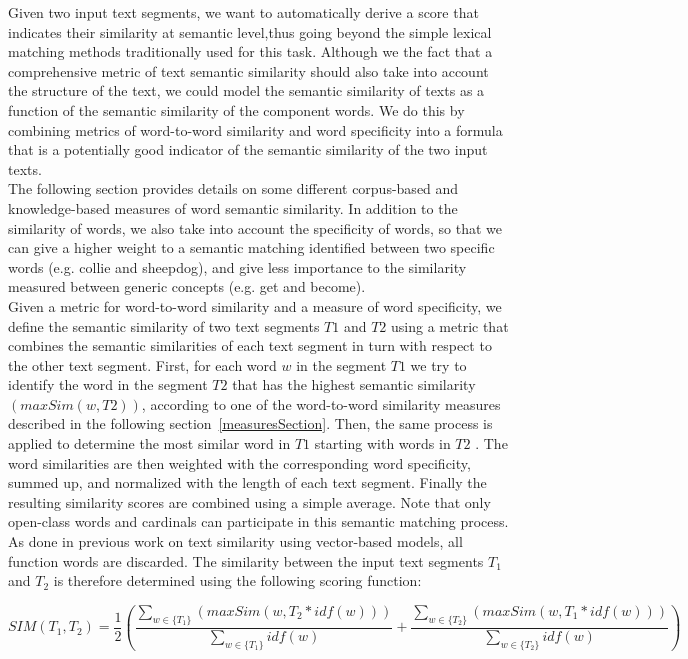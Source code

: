 Given two input text segments, we want to automatically derive a score that indicates their similarity at semantic level,thus going beyond the simple lexical matching methods traditionally used for this task. Although we the fact that a comprehensive metric of text semantic similarity  should also take into account the structure of the text, we could model the semantic similarity of texts as a function of the semantic similarity of the component words. We do this by combining metrics of word-to-word similarity and word specificity into a formula that is a potentially good indicator of the semantic similarity of the two input texts.\\
   The following section provides details on some different corpus-based and knowledge-based measures of word semantic similarity. In addition to the similarity of words, we also take into account the specificity of words, so that we can give a higher weight to a semantic matching identified between two specific words (e.g. collie and sheepdog), and give less importance to the similarity measured between generic concepts 
(e.g. get and become).\\
Given a metric for word-to-word similarity and a measure of word specificity, we define the semantic similarity of two text segments $T1$ and $T2$ using a metric that combines the semantic similarities of each text segment in turn with respect to the other text segment. First, for each word $w$ in the segment $T1$ we try to identify the word in the segment $T2$ that has the highest semantic similarity $(maxSim(w, T2 ))$, according to one of the word-to-word similarity measures described in the following section~\ref{measuresSection}. Then, the same process is applied to determine the most similar word in $T1$ starting with words in $T2$ . The word similarities are then weighted with the corresponding word specificity, summed up, and normalized with the length of each text segment. Finally the resulting similarity scores are combined using a simple average. Note that only open-class words and cardinals can participate in this semantic matching process. As done in previous work on text similarity using vector-based models, all function words are discarded.
The similarity between the input text segments $T_1$ and $T_2$ is therefore determined using the following scoring function:
    
\begin{equation}
\label{simEq}
SIM({T_{1}},{T_{2}}) =\frac{1}{2}(\frac{\sum_{w\in \{T_1\}} (maxSim(w,T_2 * idf(w)))}{\sum_{w\in \{T_1\}} idf(w)} + \frac{\sum_{w\in \{T_2\}} (maxSim(w,T_1 * idf(w)))}{\sum_{w\in \{T_2\}} idf(w)})
\end{equation}

